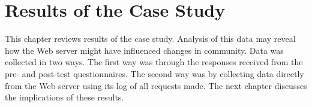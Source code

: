 
\chapter{Results of the Case Study}
\label{chap:results}



This chapter reviews results of the case study.  Analysis of this data may
reveal how the Web server might have influenced changes in community.  Data was
collected in two ways.  The first way was through the responses received from
the pre- and post-test questionnaires.  The second way was by collecting data
directly from the Web server using its log of all requests made.  The next
chapter discusses the implications of these results.


